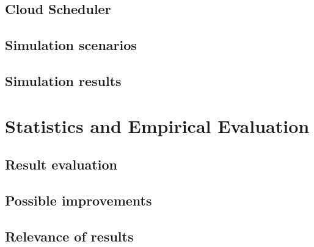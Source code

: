 \subsection{Cloud Scheduler}

\subsection{Simulation scenarios}

\subsection{Simulation results}


\section{Statistics and Empirical Evaluation}

\subsection{Result evaluation}

\subsection{Possible improvements}

\subsection{Relevance of results}



